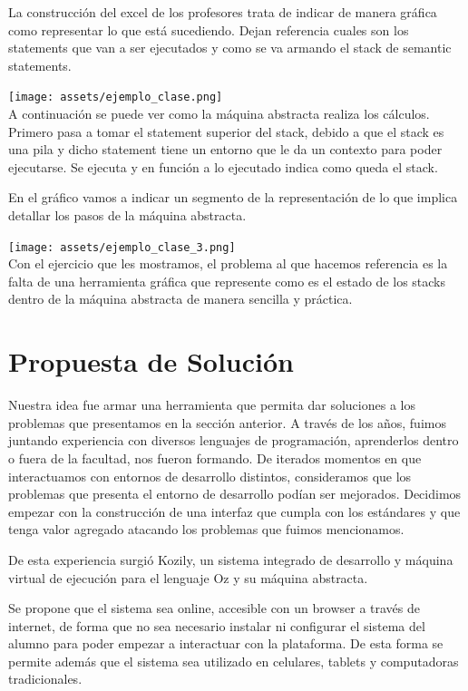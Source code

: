 \documentclass[a4paper,11pt]{article}
\begin{document}
La construcción del excel de los profesores trata de indicar de manera gráfica como representar lo que está sucediendo. Dejan referencia cuales son los statements que van a ser ejecutados y como se va armando el stack de semantic statements.

\texttt{[image: assets/ejemplo\_clase.png]}\\[1cm]

A continuación se puede ver como la máquina abstracta realiza los cálculos. Primero pasa a tomar el statement superior del stack, debido a que el stack es una pila y dicho statement tiene un entorno que le da un contexto para poder ejecutarse. Se ejecuta y en función a lo ejecutado indica como queda el stack.

En el gráfico vamos a indicar un segmento de la representación de lo que implica detallar los pasos de la máquina abstracta. 

\texttt{[image: assets/ejemplo\_clase\_3.png]}\\[1cm]

Con el ejercicio que les mostramos, el problema al que hacemos referencia es la falta de una herramienta gráfica que represente como es el estado de los stacks dentro de la máquina abstracta de manera sencilla y práctica.

\section{Propuesta de Solución}

Nuestra idea fue armar una herramienta que permita dar soluciones a los problemas que presentamos en la sección anterior.
A través de los años, fuimos juntando experiencia con diversos lenguajes de programación, aprenderlos dentro o fuera de la facultad, nos fueron formando. De iterados momentos en que interactuamos con entornos de desarrollo distintos, consideramos que los problemas que presenta el entorno de desarrollo podían ser mejorados. Decidimos empezar con la construcción de una interfaz que cumpla con los estándares y que tenga valor agregado atacando los problemas que fuimos mencionamos.

De esta experiencia surgió Kozily, un sistema integrado de desarrollo y máquina virtual de ejecución para el lenguaje Oz y su máquina abstracta.

Se propone que el sistema sea online, accesible con un browser a través de internet, de forma que no sea necesario instalar ni configurar el sistema del alumno para poder empezar a interactuar con la plataforma. De esta forma se permite además que el sistema sea utilizado en celulares, tablets y computadoras tradicionales.
\end{document}

